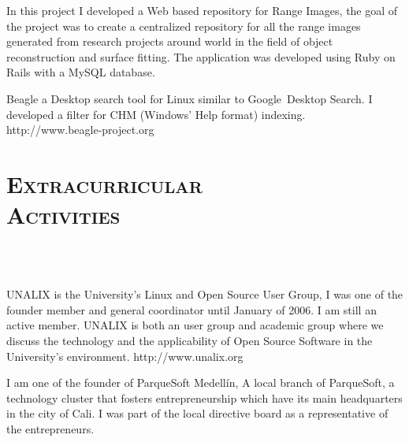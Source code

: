 \begin{resume}
\begin{position}
 In this project I developed a Web based repository for Range Images, the goal of the
 project was to create a centralized repository for all the range
 images generated from research projects around world in the field of
 object reconstruction and surface fitting. The application was
 developed using Ruby on Rails with a MySQL database.

\end{position}

\begin{position}
Beagle a Desktop search tool  for Linux similar to
Google\texttrademark  \  Desktop
Search. I developed a filter for CHM (Windows' Help format) indexing.
http://www.beagle-project.org
\end{position}


\section{\textsc{Extracurricular\\ Activities}}

\begin{formatb}
  \\
   
  \body\\
\end{formatb}

\begin{position}
UNALIX is the University's Linux and Open Source User Group, I was one
of the founder member  and general coordinator until January of
2006. I am still an active member. UNALIX is both an user group and academic group where we
discuss the technology and the applicability of Open Source Software
in the University's environment. http://www.unalix.org
\end{position}

\begin{position}
I am one of the founder of ParqueSoft Medell\'{i}n, A local branch of
ParqueSoft, a technology cluster that fosters entrepreneurship which have its 
main headquarters in the city of Cali.  I was part of the local directive board
as a representative of the entrepreneurs.
\end{position}


\end{resume}
